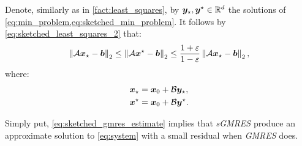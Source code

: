 Denote, similarly as in \cref{fact:least_squares}, by $\bm{y}_{\star}, \bm{y}^{\star} \in \mathbb{R}^{d}$ the solutions of \cref{eq:min_problem,eq:sketched_min_problem}. It follows by \cref{eq:sketched_least_squares_2} that:
\begin{align}
    \left\lVert \mathcal{A} \bm{x}_{\star} - \bm{b} \right\rVert_2 \leq \left\lVert \mathcal{A} \bm{x}^{\star} - \bm{b} \right\rVert_2 \leq \frac{1 + \varepsilon}{1 - \varepsilon} \left\lVert \mathcal{A} \bm{x}_{\star} - \bm{b} \right\rVert_2, \label{eq:sketched_gmres_estimate}
\end{align}
where:
\begin{align}
    \bm{x}_{\star} &= \bm{x}_0 + \mathcal{B} \bm{y}_{\star}, \\
    \bm{x}^{\star} &= \bm{x}_0 + \mathcal{B} \bm{y}^{\star}.
\end{align}

Simply put, \cref{eq:sketched_gmres_estimate} implies that \textit{sGMRES} produce an approximate solution to \cref{eq:system} with a small residual when \textit{GMRES} does.